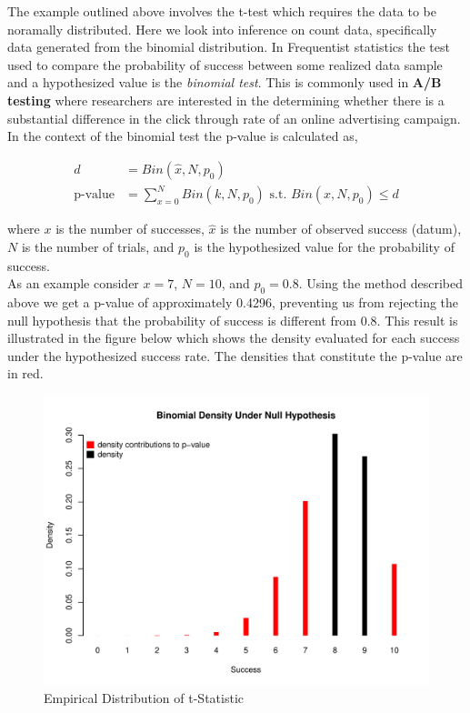 \documentclass[12pt]{article}
\begin{document}
The example outlined above involves the t-test which requires the data to be noramally distributed. Here we look into inference on count data, specifically data generated from the binomial distribution. In Frequentist statistics the test used to compare the probability of success between some realized data sample and a hypothesized value is the \emph{binomial test}. This is commonly used in \textbf{A/B testing} where researchers are interested in the determining whether there is a substantial difference in the click through rate of an online advertising campaign. \\

\noindent In the context of the binomial test the p-value is calculated as,

\begin{align*}
d &= Bin(\hat{x}, N, p_0) \\
\mbox{p-value} &= \sum_{x=0}^{N}Bin(k, N, p_0) \mbox{ s.t. } Bin(x, N, p_0) \leq d
\end{align*}

\noindent where $x$ is the number of successes, $\hat{x}$ is the number of observed success (datum), $N$ is the number of trials, and $p_0$ is the hypothesized value for the probability of success. \\

\noindent As an example consider $x = 7$, $N = 10$, and $p_0 = 0.8$. Using the method described above we get a p-value of approximately 0.4296, preventing us from rejecting the null hypothesis that the probability of success is different from 0.8. This result is illustrated in the figure below which shows the density evaluated for each success under the hypothesized success rate. The densities that constitute the p-value are in red.

\begin{figure}[H]\caption[]{Empirical Distribution of t-Statistic}
\centering
\begin{minipage}{0.6\linewidth}
\includegraphics[trim={0cm 0cm 0cm 1.5cm}, clip, scale=0.6]{../figs/bintest_dist.pdf}
\end{minipage}
\end{figure}
\end{document}

